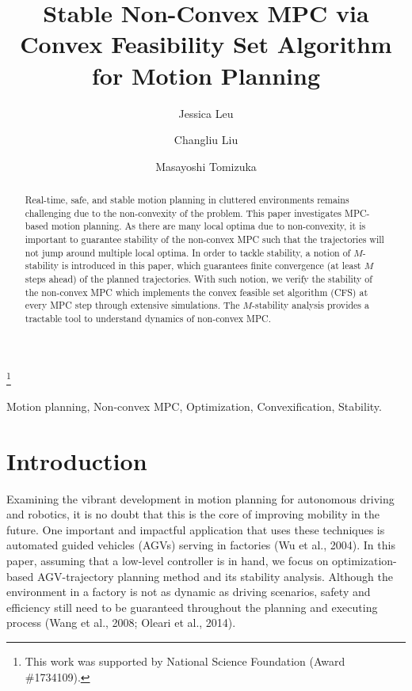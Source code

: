 \begin{frontmatter}

\title{Stable Non-Convex MPC via Convex Feasibility Set Algorithm for Motion Planning} 

\thanks[footnoteinfo]{This work was supported by National Science Foundation (Award \#1734109).}

\author[First]{ Jessica Leu} 
\author[Second]{ Changliu Liu} 
\author[First]{ Masayoshi Tomizuka}

\address[First]{ University of California,
Berkeley, CA 94720 USA\\ \tt jess.leu24@berkeley.edu, tomizuka@me.berkeley.edu}
\address[Second]{ Stanford University, CA 94305 USA\\ \tt  changliuliu@stanford.edu}


\begin{abstract}                %
Real-time, safe, and stable motion planning in cluttered environments remains challenging due to the non-convexity of the problem. This paper investigates MPC-based motion planning. As there are many local optima due to non-convexity, it is important to guarantee stability of the non-convex MPC such that the trajectories will not jump around multiple local optima. In order to tackle stability, a notion of $M$-stability is introduced in this paper, which guarantees finite convergence (at least $M$ steps ahead) of the planned trajectories. With such notion, we verify the stability of the non-convex MPC which implements the convex feasible set algorithm (CFS) at every MPC step through extensive simulations. The $M$-stability analysis provides a tractable tool to understand dynamics of non-convex MPC.
 

\end{abstract}

\begin{keyword}
Motion planning, Non-convex MPC, Optimization, Convexification, Stability.
\end{keyword}

\end{frontmatter}

\section{Introduction}
Examining the vibrant development in motion planning for autonomous driving and robotics, it is no doubt that this is the core of improving mobility in the future. One important and impactful application that uses these techniques is automated guided vehicles (AGVs) serving in factories (Wu et al., 2004). In this paper, assuming that a low-level controller is in hand, we focus on optimization-based AGV-trajectory planning method and its stability analysis. Although the environment in a factory is not as dynamic as driving scenarios, safety and efficiency still need to be guaranteed throughout the planning and executing process (Wang et al., 2008; Oleari et al., 2014).

